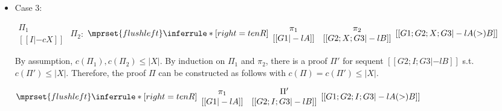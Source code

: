 \begin{itemize}
\item Case 3:
      \begin{center}
        \scriptsize
        \begin{math}
          \begin{array}{c}
            \Pi_1 \\
            {[[I |-c X]]}
          \end{array}
        \end{math}
        \qquad\qquad
        $\Pi_2$:
        \begin{math}
          $$\mprset{flushleft}
          \inferrule* [right={\tiny tenR}] {
            {
              \begin{array}{cc}
                \pi_1 & \pi_2 \\
                {[[G1 |-l A]]} & {[[G2; X; G3 |-l B]]}
              \end{array}
            }
          }{[[G1; G2; X; G3 |-l A (>) B]]}
        \end{math}
      \end{center}
      By assumption, $c(\Pi_1),c(\Pi_2)\leq |X|$. By induction on $\Pi_1$
      and $\pi_2$, there is a proof $\Pi'$ for sequent
      $[[G2; I; G3 |-l B]]$ s.t. $c(\Pi') \leq |X|$. Therefore, the proof
      $\Pi$ can be constructed as follows with $c(\Pi) = c(\Pi') \leq |X|$.
      \begin{center}
        \scriptsize
        \begin{math}
          $$\mprset{flushleft}
          \inferrule* [right={\tiny tenR}] {
            {
              \begin{array}{cc}
                \pi_1 & \Pi' \\
                {[[G1 |-l A]]} & {[[G2; I; G3 |-l B]]}
              \end{array}
            }
          }{[[G1; G2; I; G3 |-l A (>) B]]}
        \end{math}
      \end{center}


\end{itemize}
